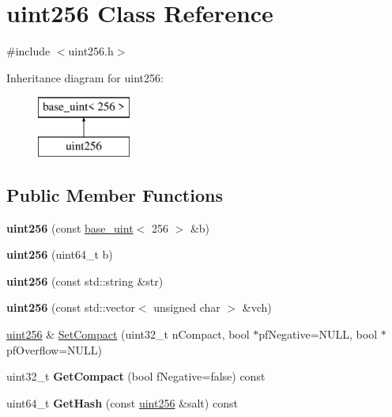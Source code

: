 \hypertarget{classuint256}{}\section{uint256 Class Reference}
\label{classuint256}


{\ttfamily \#include $<$uint256.\+h$>$}

Inheritance diagram for uint256\+:\begin{figure}[H]
\begin{center}
\leavevmode
\includegraphics[height=2.000000cm]{classuint256}
\end{center}
\end{figure}
\subsection*{Public Member Functions}
\begin{DoxyCompactItemize}
\item 
\mbox{\label{classuint256_af6d285b43ee909dd07448c0dba0c1606}} 
{\bfseries uint256} (const \mbox{\hyperlink{classbase__uint}{base\+\_\+uint}}$<$ 256 $>$ \&b)
\item 
\mbox{\label{classuint256_a1d340146fe2db1dfe45bc6c721e7588b}} 
{\bfseries uint256} (uint64\+\_\+t b)
\item 
\mbox{\label{classuint256_a4078e4911984722778f19581865462b9}} 
{\bfseries uint256} (const std\+::string \&str)
\item 
\mbox{\label{classuint256_a7cad0fc486ebc2ed02462d5a7d4e4f2d}} 
{\bfseries uint256} (const std\+::vector$<$ unsigned char $>$ \&vch)
\item 
\mbox{\hyperlink{classuint256}{uint256}} \& \mbox{\hyperlink{classuint256_a54bc91c8535c43f881bba1fdb11ca7fa}{Set\+Compact}} (uint32\+\_\+t n\+Compact, bool $\ast$pf\+Negative=N\+U\+LL, bool $\ast$pf\+Overflow=N\+U\+LL)
\item 
\mbox{\label{classuint256_a62d6d46078edb8cdb742e2430a3b1998}} 
uint32\+\_\+t {\bfseries Get\+Compact} (bool f\+Negative=false) const
\item 
\mbox{\label{classuint256_a6dfa79998c7cb7def7a6c7c0a6915c58}} 
uint64\+\_\+t {\bfseries Get\+Hash} (const \mbox{\hyperlink{classuint256}{uint256}} \&salt) const
\end{DoxyCompactItemize}
